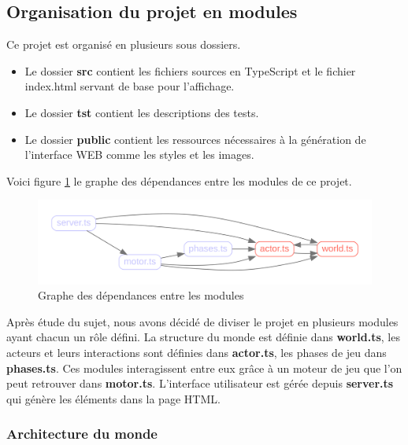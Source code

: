 \documentclass[french]{article}
\begin{document}
\subsection{Organisation du projet en modules}


Ce projet est organisé en plusieurs sous dossiers.
\begin{itemize}
    \item Le dossier \textbf{src} contient les fichiers sources en TypeScript et le fichier index.html servant de base pour l'affichage.
    \item Le dossier \textbf{tst} contient les descriptions des tests.
    \item Le dossier \textbf{public} contient les ressources nécessaires à la génération de l'interface WEB comme les styles et les images.
\end{itemize}


Voici figure \ref{fig:graph} le graphe des dépendances entre les modules de ce projet.

\begin{figure}[H]
    \centering
    \includegraphics[width=\textwidth]{graph.png}
    \caption{Graphe des dépendances entre les modules}
    \label{fig:graph}
\end{figure}




Après étude du sujet, nous avons décidé de diviser le projet en plusieurs modules ayant chacun un rôle défini.
La structure du monde est définie dans \textbf{world.ts}, les acteurs et leurs interactions sont définies dans \textbf{actor.ts}, les phases de jeu dans \textbf{phases.ts}.
Ces modules interagissent entre eux grâce à un moteur de jeu que l'on peut retrouver dans \textbf{motor.ts}.
L'interface utilisateur est gérée depuis \textbf{server.ts} qui génère les éléments dans la page HTML.

\subsubsection{Architecture du monde}
\end{document}

